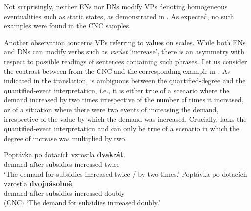 \documentclass[output=paper,
modfonts,
hidelinks,
newtxmath
]{langscibook}
\begin{document}
\ea {}
\z \z

\noindent Not surprisingly, neither ENs nor DNs modify VPs denoting homogeneous eventualities such as static states, as demonstrated in . As expected, no such examples were found in the CNC samples.

\z

\noindent Another observation concerns VPs referring to values on scales. While both ENs and DNs can modify verbs such as \textit{vzrůst} `increase', there is an asymmetry with respect to possible readings of sentences containing such phrases. Let us consider the contrast between  from the CNC and the corresponding example in . As indicated in the translation,  is ambiguous between the quantified-degree and the quantified-event interpretation, i.e., it is either true of a scenario where the demand increased by two times irrespective of the number of times it increased, or of a situation where there were two events of increasing the demand, irrespective of the value by which the demand was increased. Crucially,  lacks the quantified-event interpretation and can only be true of a scenario in which the degree of increase was multiplied by two.

\ea \ea \gll Poptávka po dotacích vzrostla \textbf{dvakrát}.\label{dvakrat-increase}\\
demand after subsidies increased twice\\
\glt `The demand for subsidies increased twice / by two times.'
\ex \gll Poptávka po dotacích vzrostla \textbf{dvojnásobně}.\label{dvojnasobne-increase}\\
demand after subsidies increased doubly\\\hfill(CNC)
\glt `The demand for subsidies increased doubly.'
\z \z
\end{document}
